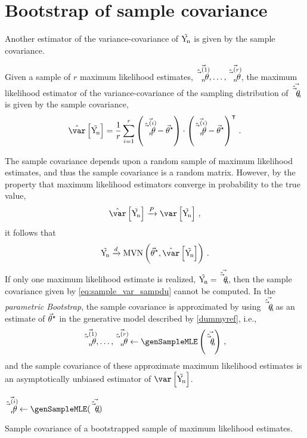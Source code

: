 \documentclass[../main.tex]{subfiles}
\begin{document}
\chapter{Bootstrap of sample covariance}
Another estimator of the variance-covariance of $\mathrm{\vec{Y_{\!n}}}$ is given by the sample covariance.
\begin{definition}
	Given a sample of $r$ maximum likelihood estimates, $\vec{\hat{\vec{\theta}}_{n}^{(1)}}, \ldots, \vec{\hat{\vec{\theta}}_{n}^{(r)}}$, the maximum likelihood estimator of the variance-covariance of the sampling distribution of $\vec{\hat{\vec{\theta}}_{n}}$ is given by the sample covariance,
	\begin{align}
	\label{eq:sample_var_sampd}
	\estimator{\var}\left[\sampdu\right] = \frac{1}{r}
	\sum_{i=1}^{r}
	\left(\mleui{i} - \tparam\sysparamvec\right) \cdot
	\left(\mleui{i} - \tparam\sysparamvec\right)^{\intercal}\,.
	\end{align}
\end{definition}
The sample covariance depends upon a random sample of maximum likelihood estimates, and thus the sample covariance is a random matrix. However, by the property that maximum likelihood estimators converge in probability to the true value,
\begin{equation}
\estimator\var\left[\sampdu\right] \xrightarrow{P} \var\left[\sampdu\right]\,,
\end{equation}
it follows that
\begin{equation}
\sampdu \xrightarrow{d} \mvn\left(\tparam\sysparamvec, \estimator\var\left[\sampdu\right]\right)\,.
\end{equation}
If only one maximum likelihood estimate is realized, $\mathrm{\vec{Y_{\!n}}} = \vec{\hat{\vec{\theta}}_{n}}$, then 
the sample covariance given by \cref{eq:sample_var_sampdu} cannot be computed. 
In the \emph{parametric Bootstrap}, the sample covariance is approximated by 
using $\vec{\hat{\vec{\theta}}_{n}}$ as an estimate of ${\vec{\theta}}^{\star}$ in the generative model 
described by \cref{dummyref}, i.e.,
\begin{equation}
\mleui{1}, \ldots, \mleui{r} \gets \genSampleMLE\left(\mleu\right)\,,
\end{equation}
and the sample covariance of these approximate maximum likelihood estimates is an asymptotically unbiased estimator of $\var\left[\sampdu\right]$.

\begin{algorithm}
	\DontPrintSemicolon
	\BlankLine
	{
		{
			$\mleui{i} \gets \genSampleMLE(\mleu)$\;
		}
	}
	\caption{Sample covariance of a bootstrapped sample of maximum likelihood estimates.}
	\label{alg:samp_du_gen_model}
\end{algorithm}
\end{document}

